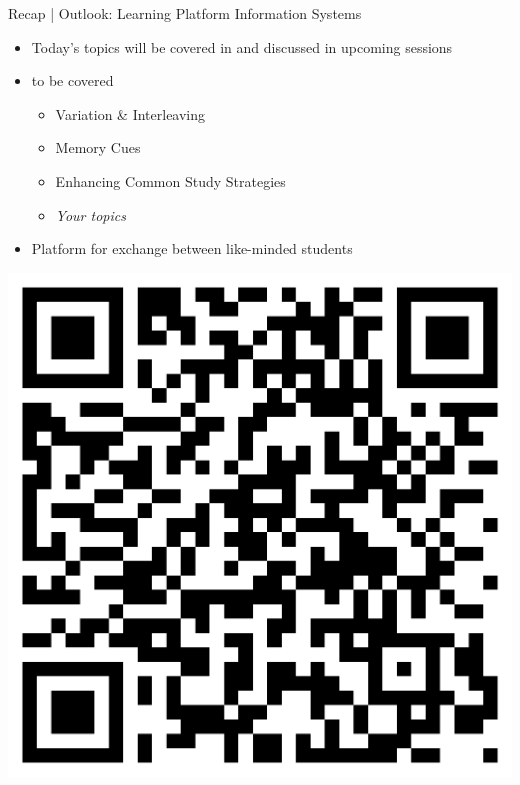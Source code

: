 \documentclass{ercisbeamer}
\begin{document}
\begin{frame}{Recap | Outlook: Learning Platform Information Systems}
    \centering
    \begin{minipage}[c]{.6\textwidth}
        \centering
        \begin{itemize}
            \item Today's topics will be covered in  and discussed in upcoming sessions
            \item {} to be covered
            \begin{itemize}
                \item Variation \& Interleaving
                \item Memory Cues
                \item Enhancing Common Study Strategies
                \item \emph{Your topics}
            \end{itemize}
            \item Platform for exchange between like-minded students
        \end{itemize}
    \end{minipage}%
    \begin{minipage}[c]{.4\textwidth}
        \centering \includegraphics[width=.35\paperwidth]{00_resources/qr_lw_course.png}
    \end{minipage}
\end{frame}
\end{document}
